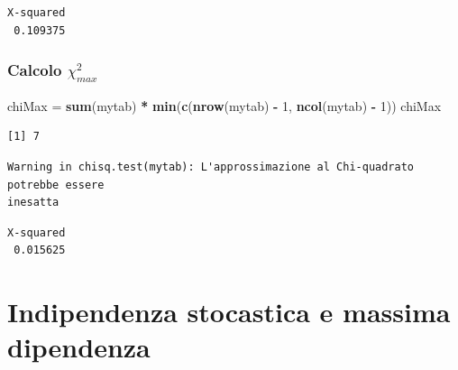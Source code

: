 \documentclass[
  a4paper,
  DIV=11,
  numbers=noendperiod]{scrreprt}
\newenvironment{Shaded}{\begin{snugshade}}{\end{snugshade}}
\newcommand{\DecValTok}[1]{\textcolor[rgb]{0.00,0.00,0.81}{#1}}
\newcommand{\FunctionTok}[1]{\textcolor[rgb]{0.13,0.29,0.53}{\textbf{#1}}}
\newcommand{\NormalTok}[1]{#1}
\newcommand{\OtherTok}[1]{\textcolor[rgb]{0.56,0.35,0.01}{#1}}
\newcommand{\SpecialCharTok}[1]{\textcolor[rgb]{0.81,0.36,0.00}{\textbf{#1}}}
\begin{document}
\begin{Shaded}
\end{Shaded}

\begin{verbatim}
X-squared 
 0.109375 
\end{verbatim}

\subsubsection{\texorpdfstring{Calcolo
\(\chi_{max}^2\)}{Calcolo \textbackslash chi\_\{max\}\^{}2}}\label{calcolo-chi_max2}

\begin{Shaded}
\begin{Highlighting}[]
\NormalTok{chiMax }\OtherTok{=} \FunctionTok{sum}\NormalTok{(mytab) }\SpecialCharTok{*} \FunctionTok{min}\NormalTok{(}\FunctionTok{c}\NormalTok{(}\FunctionTok{nrow}\NormalTok{(mytab) }\SpecialCharTok{{-}} \DecValTok{1}\NormalTok{, }\FunctionTok{ncol}\NormalTok{(mytab) }\SpecialCharTok{{-}} \DecValTok{1}\NormalTok{))}
\NormalTok{chiMax}
\end{Highlighting}
\end{Shaded}

\begin{verbatim}
[1] 7
\end{verbatim}

\begin{Shaded}
\end{Shaded}

\begin{verbatim}
Warning in chisq.test(mytab): L'approssimazione al Chi-quadrato potrebbe essere
inesatta
\end{verbatim}

\begin{verbatim}
X-squared 
 0.015625 
\end{verbatim}

\section{Indipendenza stocastica e massima
dipendenza}\label{indipendenza-stocastica-e-massima-dipendenza}
\end{document}
